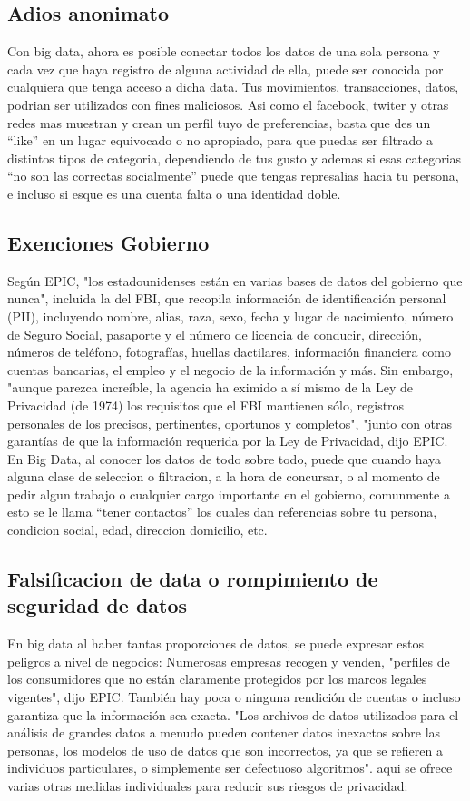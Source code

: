 \documentclass[journal]{IEEEtran}
\begin{document}
\subsection{Adios anonimato}
Con big data, ahora es posible conectar todos los datos de una sola persona y cada vez que haya registro de alguna actividad de ella, puede ser conocida por cualquiera que tenga acceso a dicha data. Tus movimientos, transacciones, datos, podrian ser utilizados con fines maliciosos.
Asi como el facebook, twiter y otras redes mas muestran y crean un perfil tuyo de preferencias, basta que des un “like” en un lugar equivocado o no apropiado, para que puedas ser filtrado a distintos tipos de categoria, dependiendo de tus gusto y ademas si esas categorias “no son las correctas socialmente” puede que tengas represalias hacia tu persona, e incluso si esque es una cuenta falta o una identidad doble.

\subsection{Exenciones Gobierno}
Según EPIC, "los estadounidenses están en varias bases de datos del gobierno que nunca", incluida la del FBI, que recopila información de identificación personal (PII), incluyendo nombre, alias, raza, sexo, fecha y lugar de nacimiento, número de Seguro Social, pasaporte y el número de licencia de conducir, dirección, números de teléfono, fotografías, huellas dactilares, información financiera como cuentas bancarias, el empleo y el negocio de la información y más. Sin embargo, "aunque parezca increíble, la agencia ha eximido a sí mismo de la Ley de Privacidad (de 1974) los requisitos que el FBI mantienen sólo, registros personales de los precisos, pertinentes, oportunos y completos", "junto con otras garantías de que la información requerida por la Ley de Privacidad, dijo EPIC.
En Big Data, al conocer los datos de todo sobre todo, puede que cuando haya alguna clase de seleccion o filtracion, a la hora de concursar, o al momento de pedir algun trabajo o cualquier cargo importante en el gobierno, comunmente a esto se le llama “tener contactos” los cuales dan referencias sobre tu persona, condicion social, edad, direccion domicilio, etc.

\subsection{ Falsificacion de data o rompimiento de seguridad de datos}
En big data al haber tantas proporciones de datos, se puede expresar estos peligros a nivel de negocios:
Numerosas empresas recogen y venden, "perfiles de los consumidores que no están claramente protegidos por los marcos legales vigentes", dijo EPIC.
También hay poca o ninguna rendición de cuentas o incluso garantiza que la información sea exacta.
"Los archivos de datos utilizados para el análisis de grandes datos a menudo pueden contener datos inexactos sobre las personas, los modelos de uso de datos que son incorrectos, ya que se refieren a individuos particulares, o simplemente ser defectuoso algoritmos".
aqui se ofrece varias otras medidas individuales para reducir sus riesgos de privacidad:
\end{document}

